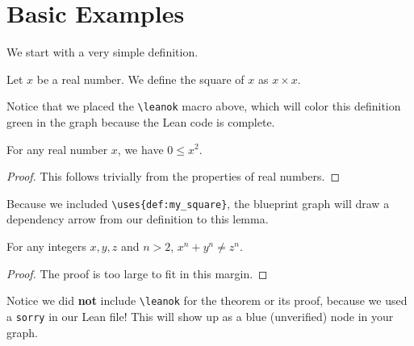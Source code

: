 %

\chapter{Basic Examples}

We start with a very simple definition.

\begin{definition}\label{def:my_square}
\leanok
Let $x$ be a real number. We define the square of $x$ as $x \times x$.
\end{definition}

Notice that we placed the \texttt{\textbackslash leanok} macro above, which will color this definition green in the graph because the Lean code is complete.

\begin{lemma}\label{lem:square_nonneg}
\leanok
For any real number $x$, we have $0 \le x^2$.
\end{lemma}
\begin{proof}
\leanok
This follows trivially from the properties of real numbers.
\end{proof}

Because we included \texttt{\textbackslash uses\{def:my\_square\}}, the blueprint graph will draw a dependency arrow from our definition to this lemma.

\begin{theorem}\label{thm:fermat}
For any integers $x, y, z$ and $n > 2$, $x^n + y^n \ne z^n$.
\end{theorem}
\begin{proof}
The proof is too large to fit in this margin.
\end{proof}

Notice we did \textbf{not} include \texttt{\textbackslash leanok} for the theorem or its proof, because we used a \texttt{sorry} in our Lean file! This will show up as a blue (unverified) node in your graph.